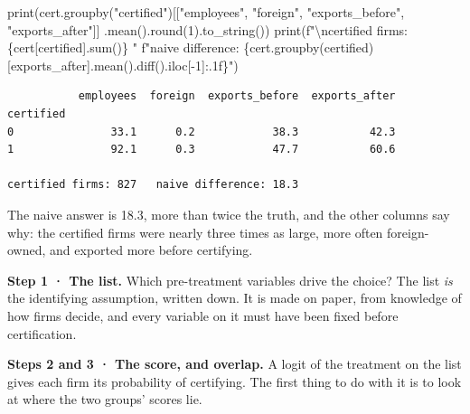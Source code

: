 \documentclass[
  letterpaper,
  10pt,
  twoside,
  openright,
  numbers=noenddot,
  chapterprefix=true]{scrbook}
\newenvironment{Shaded}{}{}
\newcommand{\BuiltInTok}[1]{\textcolor[rgb]{0.84,0.23,0.29}{#1}}
\newcommand{\CharTok}[1]{\textcolor[rgb]{0.01,0.18,0.38}{#1}}
\newcommand{\DecValTok}[1]{\textcolor[rgb]{0.00,0.36,0.77}{#1}}
\newcommand{\NormalTok}[1]{\textcolor[rgb]{0.14,0.16,0.18}{#1}}
\newcommand{\OperatorTok}[1]{\textcolor[rgb]{0.14,0.16,0.18}{#1}}
\newcommand{\SpecialCharTok}[1]{\textcolor[rgb]{0.00,0.36,0.77}{#1}}
\newcommand{\SpecialStringTok}[1]{\textcolor[rgb]{0.01,0.18,0.38}{#1}}
\newcommand{\StringTok}[1]{\textcolor[rgb]{0.01,0.18,0.38}{#1}}
\begin{document}
\begin{Shaded}
\begin{Highlighting}[]
\BuiltInTok{print}\NormalTok{(cert.groupby(}\StringTok{"certified"}\NormalTok{)[[}\StringTok{"employees"}\NormalTok{, }\StringTok{"foreign"}\NormalTok{, }\StringTok{"exports\_before"}\NormalTok{, }\StringTok{"exports\_after"}\NormalTok{]]}
\NormalTok{      .mean().}\BuiltInTok{round}\NormalTok{(}\DecValTok{1}\NormalTok{).to\_string())}
\BuiltInTok{print}\NormalTok{(}\SpecialStringTok{f"}\CharTok{\textbackslash{}n}\SpecialStringTok{certified firms: }\SpecialCharTok{\{}\NormalTok{cert[}\StringTok{\textquotesingle{}certified\textquotesingle{}}\NormalTok{]}\SpecialCharTok{.}\BuiltInTok{sum}\NormalTok{()}\SpecialCharTok{\}}\SpecialStringTok{   "}
      \SpecialStringTok{f"naive difference: }\SpecialCharTok{\{}\NormalTok{cert}\SpecialCharTok{.}\NormalTok{groupby(}\StringTok{\textquotesingle{}certified\textquotesingle{}}\NormalTok{)[}\StringTok{\textquotesingle{}exports\_after\textquotesingle{}}\NormalTok{]}\SpecialCharTok{.}\NormalTok{mean()}\SpecialCharTok{.}\NormalTok{diff()}\SpecialCharTok{.}\NormalTok{iloc[}\OperatorTok{{-}}\DecValTok{1}\NormalTok{]}\SpecialCharTok{:.1f\}}\SpecialStringTok{"}\NormalTok{)}
\end{Highlighting}
\end{Shaded}

\begin{verbatim}
           employees  foreign  exports_before  exports_after
certified                                                   
0               33.1      0.2            38.3           42.3
1               92.1      0.3            47.7           60.6

certified firms: 827   naive difference: 18.3
\end{verbatim}

The naive answer is 18.3, more than twice the truth, and the other
columns say why: the certified firms were nearly three times as large,
more often foreign-owned, and exported more before certifying.

\textbf{Step 1 · The list.} Which pre-treatment variables drive the
choice? The list \emph{is} the identifying assumption, written down. It
is made on paper, from knowledge of how firms decide, and every variable
on it must have been fixed before certification.

\textbf{Steps 2 and 3 · The score, and overlap.} A logit of the
treatment on the list gives each firm its probability of certifying. The
first thing to do with it is to look at where the two groups' scores
lie.
\end{document}
